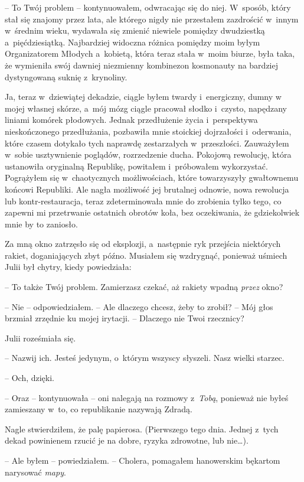 \documentclass[oneside,polish,11pt,sfheadings]{mwbk}
\begin{document}
-- To Twój problem -- kontynuowałem, odwracając się do niej. W~sposób,
który stał się znajomy przez lata, ale którego nigdy nie przestałem
zazdrościć w~innym w~średnim wieku, wydawała się zmienić niewiele
pomiędzy dwudziestką a~pięćdziesiątką. Najbardziej widoczna różnica
pomiędzy moim byłym Organizatorem Młodych a~kobietą, która teraz stała w~moim biurze, była taka, że wymieniła swój dawniej niezmienny kombinezon
kosmonauty na bardziej dystyngowaną suknię z~krynoliny.

Ja, teraz w~dziewiątej dekadzie, ciągle byłem twardy i~energiczny, dumny
w mojej własnej skórze, a~mój mózg ciągle pracował słodko i~czysto,
napędzany liniami komórek płodowych. Jednak przedłużenie życia i~perspektywa nieskończonego przedłużania, pozbawiła mnie stoickiej
dojrzałości i~oderwania, które czasem dotykało tych naprawdę
zestarzałych w~przeszłości. Zauważyłem w~sobie usztywnienie poglądów,
rozrzedzenie ducha. Pokojową rewolucję, która ustanowiła oryginalną
Republikę, powitałem i~próbowałem wykorzystać. Pogrążyłem się w~chaotycznych możliwościach, które towarzyszyły gwałtownemu końcowi
Republiki. Ale nagła możliwość jej brutalnej odnowie, nowa rewolucja lub
kontr-restauracja, teraz zdeterminowała mnie do zrobienia tylko tego, co
zapewni mi przetrwanie ostatnich obrotów koła, bez oczekiwania, że
gdziekolwiek mnie by to zaniosło.

Za mną okno zatrzęsło się od eksplozji, a~następnie ryk przejścia
niektórych rakiet, doganiających zbyt późno. Musiałem się wzdrygnąć,
ponieważ uśmiech Julii był chytry, kiedy powiedziała:

-- To także Twój problem. Zamierzasz czekać, aż rakiety wpadną
\emph{przez} okno?

-- Nie -- odpowiedziałem. -- Ale dlaczego chcesz, żeby to zrobił? -- Mój
głos brzmiał zrzędnie ku mojej irytacji. -- Dlaczego nie Twoi rzecznicy?

Julii roześmiała się. 

-- Nazwij ich. Jesteś jedynym, o~którym wszyscy
słyszeli. Nasz wielki starzec.

-- Och, dzięki.

-- Oraz -- kontynuowała -- oni nalegają na rozmowy z~\emph{Tobą}, ponieważ
nie byłeś zamieszany w~to, co republikanie nazywają Zdradą.

Nagle stwierdziłem, że palę papierosa. (Pierwszego tego dnia. Jednej z~tych dekad powinienem rzucić je na dobre, ryzyka zdrowotne, lub nie\ldots).

-- Ale byłem -- powiedziałem. -- Cholera, pomagałem hanowerskim bękartom
narysować \emph{mapy}.
\end{document}
